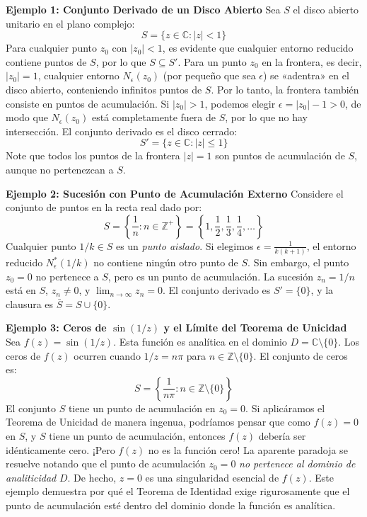 \documentclass[a4paper]{article}
\begin{document}
\textbf{Ejemplo 1: Conjunto Derivado de un Disco Abierto}
Sea $S$ el disco abierto unitario en el plano complejo:
$$ S = \{ z \in \mathbb{C} : |z| < 1 \} $$
Para cualquier punto $z_0$ con $|z_0| < 1$, es evidente que cualquier entorno reducido contiene puntos de $S$, por lo que $S \subseteq S'$. 
Para un punto $z_0$ en la frontera, es decir, $|z_0| = 1$, cualquier entorno $N_\epsilon(z_0)$ (por pequeño que sea $\epsilon$) se «adentra» en el disco abierto, conteniendo infinitos puntos de $S$. Por lo tanto, la frontera también consiste en puntos de acumulación.
Si $|z_0| > 1$, podemos elegir $\epsilon = |z_0| - 1 > 0$, de modo que $N_\epsilon(z_0)$ está completamente fuera de $S$, por lo que no hay intersección.
El conjunto derivado es el disco cerrado:
$$ S' = \{ z \in \mathbb{C} : |z| \leq 1 \} $$
Note que todos los puntos de la frontera $|z|=1$ son puntos de acumulación de $S$, aunque no pertenezcan a $S$.

\textbf{Ejemplo 2: Sucesión con Punto de Acumulación Externo}
Considere el conjunto de puntos en la recta real dado por:
$$ S = \left\{ \frac{1}{n} : n \in \mathbb{Z}^+ \right\} = \left\{ 1, \frac{1}{2}, \frac{1}{3}, \frac{1}{4}, \dots \right\} $$
Cualquier punto $1/k \in S$ es un \textit{punto aislado}. Si elegimos $\epsilon = \frac{1}{k(k+1)}$, el entorno reducido $N_\epsilon^*(1/k)$ no contiene ningún otro punto de $S$.
Sin embargo, el punto $z_0 = 0$ no pertenece a $S$, pero es un punto de acumulación. La sucesión $z_n = 1/n$ está en $S$, $z_n \neq 0$, y $\lim_{n \to \infty} z_n = 0$.
El conjunto derivado es $S' = \{0\}$, y la clausura es $\bar{S} = S \cup \{0\}$.

\textbf{Ejemplo 3: Ceros de $\sin(1/z)$ y el Límite del Teorema de Unicidad}
Sea $f(z) = \sin(1/z)$. Esta función es analítica en el dominio $D = \mathbb{C} \setminus \{0\}$. 
Los ceros de $f(z)$ ocurren cuando $1/z = n\pi$ para $n \in \mathbb{Z} \setminus \{0\}$. El conjunto de ceros es:
$$ S = \left\{ \frac{1}{n\pi} : n \in \mathbb{Z} \setminus \{0\} \right\} $$
El conjunto $S$ tiene un punto de acumulación en $z_0 = 0$. 
Si aplicáramos el Teorema de Unicidad de manera ingenua, podríamos pensar que como $f(z) = 0$ en $S$, y $S$ tiene un punto de acumulación, entonces $f(z)$ debería ser idénticamente cero. ¡Pero $f(z)$ no es la función cero! 
La aparente paradoja se resuelve notando que el punto de acumulación $z_0 = 0$ \textit{no pertenece al dominio de analiticidad} $D$. De hecho, $z=0$ es una singularidad esencial de $f(z)$. Este ejemplo demuestra por qué el Teorema de Identidad exige rigurosamente que el punto de acumulación esté dentro del dominio donde la función es analítica.
\end{document}
